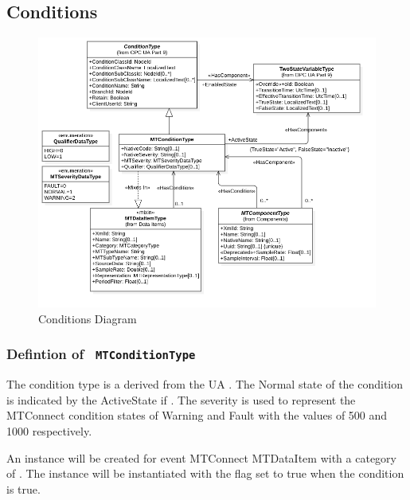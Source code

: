 \subsection{Conditions} \label{model:Conditions}

\begin{figure}[ht]
  \centering
    \includegraphics[width=1.0\textwidth]{./diagrams/types/Conditions.png}
  \caption{Conditions Diagram}
  \label{fig:Conditions}
\end{figure}

\FloatBarrier




\subsubsection{Defintion of \texttt{ MTConditionType}}
  \label{type:MTConditionType}

\FloatBarrier

The condition type is a derived from the UA . The Normal state of 
the condition is indicated by the ActiveState if . The severity 
is used to represent the MTConnect condition states of Warning and Fault with the values of
500 and 1000 respectively. 

An  instance will be created for event MTConnect \gls{MTDataItem} with a 
\gls{category} of . The  instance will be instantiated 
with the  flag set to true when the condition  is true. 

